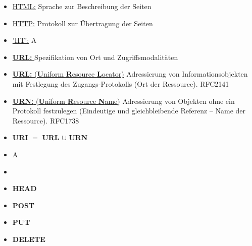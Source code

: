 
\begin{itemize}
    \item \underline{HTML:} Sprache zur Beschreibung der Seiten
    \item \underline{HTTP:} Protokoll zur Übertragung der Seiten
    \item \underline{'HT':} \todo A
\end{itemize}

\begin{itemize}
    \item \underline{\textbf{URL: }} Spezifikation von Ort und Zugriffsmodalitäten
    \item \underline{\textbf{URL:} (\textbf{U}niform \textbf{R}esource \textbf{L}ocator)} Adressierung von Informationsobjekten mit Festlegung des Zugangs-Protokolls (Ort der Ressource). RFC2141
    \item \underline{\textbf{URN:} (\textbf{U}niform \textbf{R}esource \textbf{N}ame)} Adressierung von Objekten ohne ein Protokoll festzulegen (Eindeutige und gleichbleibende Referenz – Name der Ressource). RFC1738
    \item \textbf{URI} $=$ \textbf{URL} $\cup$ \textbf{URN}
\end{itemize}

\begin{itemize}
    \item \todo A
\end{itemize}

\begin{itemize}
    \item
\end{itemize}

\begin{itemize}
    \item \textbf{HEAD}
    \item \textbf{POST}
    \item \textbf{PUT}
    \item \textbf{DELETE}
\end{itemize}

